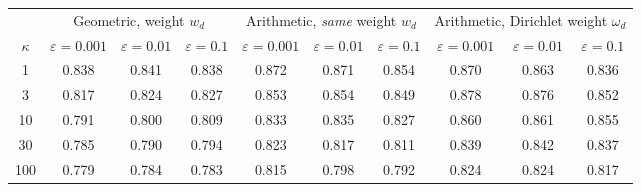 \begin{tabular}{@{}cccccccccc@{}}
\toprule
 & \multicolumn{3}{c}{Geometric, weight $w_d$} & \multicolumn{3}{c}{Arithmetic, \emph{same} weight $w_d$} & \multicolumn{3}{c}{Arithmetic, Dirichlet weight $\omega_d$} \\
\cmidrule(lr){2-4} \cmidrule(lr){5-7} \cmidrule(lr){8-10}
$\kappa$ & $\varepsilon=0.001$ & $\varepsilon=0.01$ & $\varepsilon=0.1$ & $\varepsilon=0.001$ & $\varepsilon=0.01$ & $\varepsilon=0.1$ & $\varepsilon=0.001$ & $\varepsilon=0.01$ & $\varepsilon=0.1$ \\
\midrule
1 & 0.838 & 0.841 & 0.838 & 0.872 & 0.871 & 0.854 & 0.870 & 0.863 & 0.836 \\
3 & 0.817 & 0.824 & 0.827 & 0.853 & 0.854 & 0.849 & 0.878 & 0.876 & 0.852 \\
10 & 0.791 & 0.800 & 0.809 & 0.833 & 0.835 & 0.827 & 0.860 & 0.861 & 0.855 \\
30 & 0.785 & 0.790 & 0.794 & 0.823 & 0.817 & 0.811 & 0.839 & 0.842 & 0.837 \\
100 & 0.779 & 0.784 & 0.783 & 0.815 & 0.798 & 0.792 & 0.824 & 0.824 & 0.817 \\
\bottomrule
\end{tabular}
